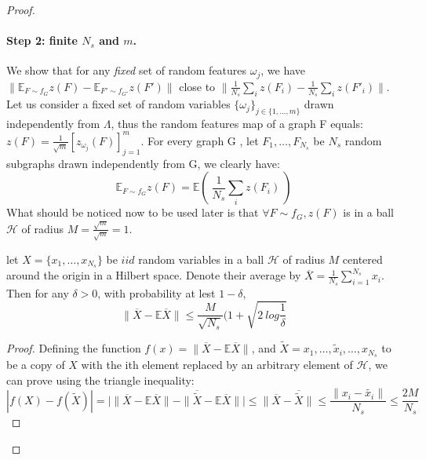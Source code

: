\begin{proof}
\paragraph{Step 2: finite ${N_s}$ and $m$.} We show that for any \emph{fixed} set of random features $\omega_j$, we have $\| \mathbb{E}_{F \sim f_G} z(F) - \mathbb{E}_{F' \sim f_{G'}} z(F')\|$ close to $\| \frac{1}{{N_s}} \sum_i z(F_i) - \frac{1}{{N_s}} \sum_i z(F'_i)\|$.  \newline
Let us consider a fixed set of random variables $\{\omega_j\}_{j \in \{1,\ldots, m\}}$ drawn independently from $\Lambda$, thus the random features map of a graph F equals: $z(F) = \frac{1}{\sqrt{m}}\left[z_{\omega_j}(F)\right]_{j=1}^m$.\newline
For every graph G , let $F_1,\ldots, F_{N_s}$ be ${N_s}$ random subgraphs drawn independently from G, we clearly have: 
\begin{equation}
\label{eq:subsample}
    \mathbb{E}_{F \sim f_G} z(F)= \mathbb{E} (~\frac{1}{{N_s}} \sum_i z(F_i)~)
\end{equation} 
What should be noticed now to be used later is that $\forall F\sim f_G, z(F)$ is in a ball $\mathcal{H}$ of radius $M=\frac{\sqrt{m}}{\sqrt{m}}=1$.
\begin{lemma}
\label{lemma:vector_hoeffding}
let $X=\{x_1,\ldots,x_{N_s}\}$ be $iid$ random variables in a ball $\mathcal{H}$ of radius $M$ centered around the origin in a Hilbert space. Denote their average by $\overline{X}=\frac{1}{{N_s}}\sum_{i=1}^{N_s}x_i$. Then for any $\delta>0$, with probability at lest $1-\delta$, 
\begin{equation}
\label{eq:vector_hoeffding0}
  \| \overline{X}-\mathbb{E}\overline{X}\|\leq \frac{M}{\sqrt{{N_s}}}(1+\sqrt{2~log\frac{1}{\delta}}
\end{equation}
\end{lemma}
\begin{proof}
Defining the function $f(x)= \| \overline{X}-\mathbb{E}\overline{X}\|$, and $\widetilde{X}={x_1,\ldots,\widetilde{x}_i,\ldots,x_{N_s}}$ to be a copy of $X$ with the ith element replaced by an arbitrary element of $\mathcal{H}$, we can prove using the triangle inequality:
\begin{equation}
    |f(X)-f(\widetilde{X})|=\Big|\| \overline{X}-\mathbb{E}\overline{X} \|-\|\overline{\widetilde{X}} - \mathbb{E}\overline{X}  \| \Big|\leq \| \overline{X} - \overline{\widetilde{X}}\|\leq
    \frac{\|x_i - \widetilde{x_i} \|}{{N_s}}\leq
    \frac{2M}{{N_s}}
\end{equation}

\end{proof}
\end{proof}
